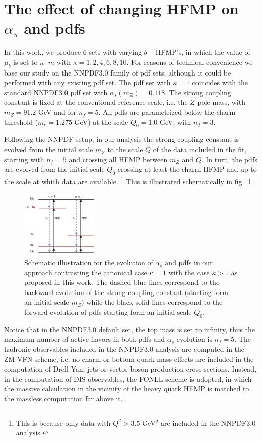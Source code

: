 \documentclass[letter,11pt]{article}
\def\as{\alpha_s}
\def\nf{{n_f}}
\def\mub{\mu_b}
\def\k{\kappa}
\begin{document}
\section{The effect of changing HFMP on $\as$ and pdfs}


In this work, we produce 6 sets with varying $b-$HFMP's, in which the value of $\mub$ is set to $\k\cdot m$ with $\k=1,2,4,6,8,10$. For reasons of technical convenience we base our study on the NNPDF3.0 family of pdf sets, although it could be performed with any existing pdf set. The pdf set with $\k=1$ coincides with the standard NNPDF3.0 pdf set with $\as(m_Z)=0.118$. The strong coupling constant is fixed at the conventional reference scale, i.e. the $Z$-pole mass, with $m_Z=91.2$ GeV and for $\nf=5$. All pdfs are parametrized below the charm threshold ($m_c=1.275$ GeV) at the scale $Q_0=1.0$ GeV, with $\nf=3$. 

Following the NNPDF setup, in our analysis the strong coupling constant is evolved from the initial scale $m_Z$ to the scale $Q$ of the data included in the fit, starting with $\nf=5$ and crossing all HFMP between $m_Z$ and $Q$. In turn, the pdfs are evolved from the initial scale $Q_0$ crossing at least the charm HFMP and up to the scale at which data are available.
%
\footnote{This is because only data with $Q^2>3.5$ GeV$^2$ are included in the NNPDF3.0 analysis.}
%
This is illustrated schematically in fig.~\ref{fig:diagram}.
%
\begin{figure}[t]
\centering
\includegraphics[width=0.33\textwidth]{./diagram2.pdf}
\caption{\label{fig:diagram} Schematic illustration for the evolution of $\as$ and pdfs in our approach contrasting the canonical case $\k=1$ with the case $\k>1$ as proposed in this work. The dashed blue lines correspond to the backward evolution of the strong coupling constant (starting form an initial scale $m_Z$) while the black solid lines correspond to the forward evolution of pdfs starting form an initial scale $Q_0$.}
\end{figure}
%


Notice that in the NNPDF3.0 default set, the top mass is set to infinity, thus the maximum number of active flavors in both pdfs and $\as$ evolution is $\nf=5$. The hadronic observables included in the NNPDF3.0 analysis are computed in the ZM-VFN scheme, i.e. no charm or bottom quark mass effects are included in the computation of Drell-Yan, jets or vector boson production cross sections. Instead, in the computation of DIS observables, the FONLL scheme is adopted, in which the massive calculation in the vicinity of the heavy quark HFMP is matched to the massless computation far above it. 
\end{document}
